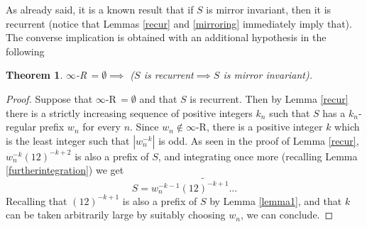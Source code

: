 \documentclass[10pt,a4paper]{article}
\newtheorem{theorem}{Theorem}
\begin{document}
As already said, it is a known result that if $S$ is mirror invariant, then it is recurrent \cite{dekking1997long} (notice that Lemmas \ref{recur} and \ref{mirroring} immediately imply that). The converse implication is obtained with an additional hypothesis in the following 
\begin{theorem}
 $\infty$-\emph{R}$\,=\emptyset\implies$ ($S$ is recurrent$\implies S$ is mirror invariant).
 \label{thm1}
 \end{theorem}
\begin{proof}
Suppose that  $\infty$-R$\,=\emptyset$ and that $S$ is recurrent. Then by Lemma \ref{recur} there is a strictly increasing sequence of positive integers $k_n$ such that $S$ has a $k_n$-regular prefix $w_n$ for every $n$. Since $w_n\notin \infty$-R, there is a positive integer $k$ which is the least integer such that $|w_n^{-k}|$ is odd. As seen in the proof of Lemma \ref{recur}, $w_n^{-k}(12)^{-k+2}$ is also a prefix of $S$, and integrating once more (recalling Lemma \ref{furtherintegration}) we get $$S=w_n^{-k-1}\widetilde{(12)^{-k+1}}\dots$$ Recalling that $(12)^{-k+1}$ is also a prefix of $S$ by Lemma \ref{lemma1}, and that $k$ can be taken arbitrarily large by suitably choosing $w_n$, we can conclude.
\end{proof}
\end{document}
